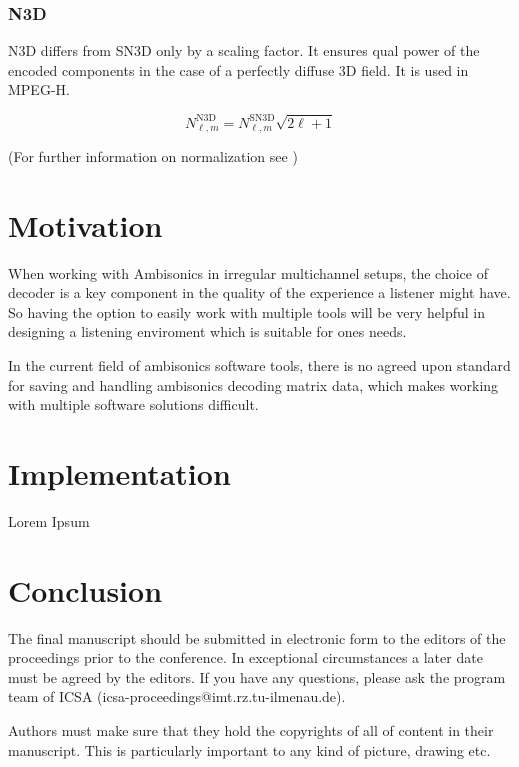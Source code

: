 \documentclass[a4paper, 10pt, twocolumn]{article}
\begin{document}
\subsubsection{N3D}

N3D differs from SN3D only by a scaling factor. It ensures qual power of the encoded components in the case of a perfectly diffuse 3D field.\autocite{daniel} It is used in MPEG-H.

\[
    N_{\ell, m}^{\mathrm{N} 3 \mathrm{D}}=N_{\ell, m}^{\mathrm{SN} 3 \mathrm{D}} \sqrt{2 \ell+1}    
\]

(For further information on normalization see \autocite{norm})

\section{Motivation} \label{sec:Motivation}

When working with Ambisonics in irregular multichannel setups, the choice of decoder is a key component in the quality of the experience a listener might have. So having the option to easily work with multiple tools will be very helpful in designing a listening enviroment which is suitable for ones needs.

In the current field of ambisonics software tools, there is no agreed upon standard for saving and handling ambisonics decoding matrix data, which makes working with multiple software solutions difficult. 

\section{Implementation} \label{sec:Implementation}

Lorem Ipsum


\section{Conclusion }
The final manuscript should be submitted in electronic form to the editors of the proceedings prior to the conference. In exceptional circumstances a later date must be agreed by the editors. If you have any questions, please ask the program team of ICSA (icsa-proceedings@imt.rz.tu-ilmenau.de).

Authors must make sure that they hold the copyrights of all of content in their manuscript. This is particularly important to any kind of picture, drawing etc.
\end{document}
